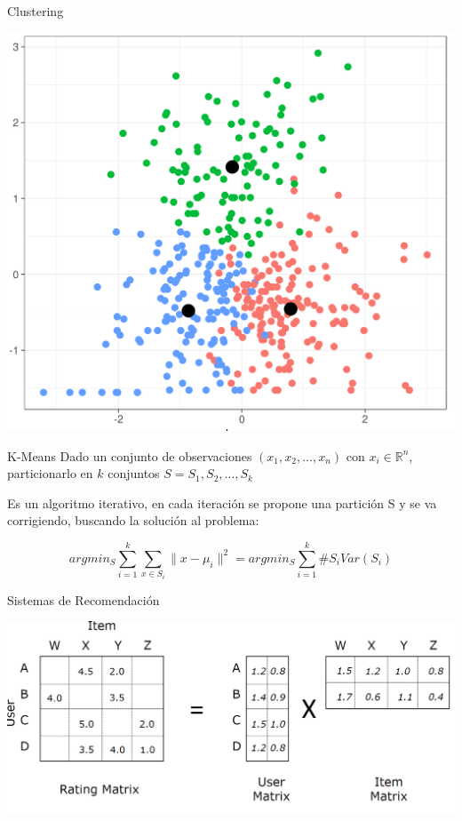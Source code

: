 \documentclass[12pt,aspectratio=169]{beamer}
\begin{document}
\begin{frame}{Clustering}
	\begin{center}
	\includegraphics[width=.5\paperwidth]{kmeans.png}
	\end{center}

\end{frame}

\begin{frame}{K-Means}
Dado un conjunto de observaciones $(x_1, x_2, \dots, x_n)$ con $x_i \in \mathbb{R}^n$, particionarlo en $k$ conjuntos $S = {S_1, S_2, \dots, S_k}$

Es un algoritmo iterativo, en cada iteración se propone una partición S y se va corrigiendo, buscando la solución al problema:

$$
argmin_S \sum_{i=1}^{k}\sum_{x \in S_i} \|x-\mu_i\|^2 =
argmin_S \sum_{i=1}^{k}\#S_i Var(S_i)
$$

\end{frame}

\begin{frame}{Sistemas de Recomendación}
	\begin{center}
		\includegraphics[width=.8\paperwidth]{recommendermatrix.png}
	\end{center}
\end{frame}
\end{document}

